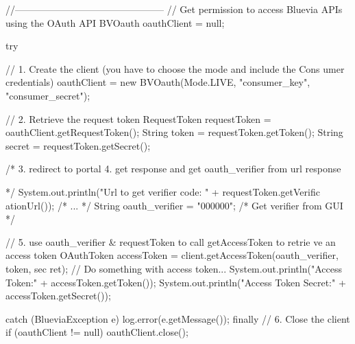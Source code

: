 \begin{DoxyCode}
//-----------------------------------------------
// Get permission to access Bluevia APIs using the OAuth API
BVOauth oauthClient = null;

try {

        // 1. Create the client (you have to choose the mode and include the Cons
      umer credentials)
        oauthClient = new BVOauth(Mode.LIVE, "consumer_key", "consumer_secret");

        // 2. Retrieve the request token
        RequestToken requestToken = oauthClient.getRequestToken();
        String token = requestToken.getToken();
        String secret = requestToken.getSecret();

        /*  
  3. redirect to portal
  4. get response and get oauth_verifier from url response
  
        */      
        System.out.println("Url to get verifier code: " + requestToken.getVerific
      ationUrl());
        /* ... */
        String oauth_verifier = "000000"; /* Get verifier from GUI */

        //  5. use oauth_verifier & requestToken to call getAccessToken to retrie
      ve an access token
        OAuthToken accessToken = client.getAccessToken(oauth_verifier, token, sec
      ret);
        // Do something with access token...
        System.out.println("Access Token:" + accessToken.getToken());
        System.out.println("Access Token Secret:" + accessToken.getSecret());


} catch (BlueviaException e){
        log.error(e.getMessage());
} finally {
        // 6. Close the client
        if (oauthClient != null) oauthClient.close();
} 
\end{DoxyCode}
 